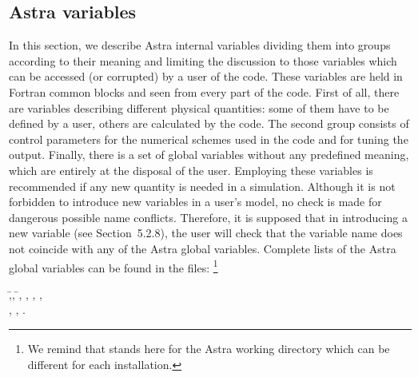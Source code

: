 \subsection{Astra variables}

In this section, we describe Astra internal variables dividing them into
groups according to their meaning and limiting the discussion to those
variables which can be accessed (or corrupted) by a user of the
code. 
These variables are held in Fortran common blocks and seen from every
part of the code. 
First of all, there are variables describing different physical
quantities: some of them have to be defined by a user, others are
calculated by the code. 
The second group consists of control parameters for the numerical
schemes used in the code and for tuning the output.
Finally, there is a set of global variables without any predefined
meaning, which are entirely at the disposal of the user. 
Employing these variables is recommended if any new quantity
is needed in a simulation. 
Although it is not forbidden to introduce new variables in a user's
model, no check is made for dangerous possible name conflicts. 
Therefore, it is supposed that in introducing a new variable (see
Section~5.2.8), the user will check that the variable name does not
coincide with any of the Astra global variables.
Complete lists of the Astra global variables can be found in the files:
\footnote
{We remind that  stands here for the Astra working directory
which can be different for each installation.}\label{AWD} 
%
\begin{tabbing}
\qquad{},\qquad\=,
\qquad\=\qquad{}, \kill
\qquad{},\>	, \>
, \\
\qquad{},\>	,\>
. 
\end{tabbing}

